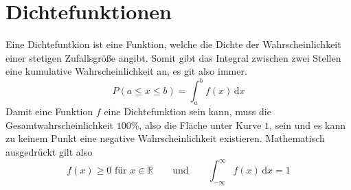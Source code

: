 \documentclass{article}
\begin{document}
\section{Dichtefunktionen}
Eine Dichtefuntkion ist eine Funktion, welche die Dichte der Wahrscheinlichkeit einer stetigen Zufallsgröße angibt. Somit gibt das Integral zwischen zwei Stellen eine kumulative Wahrscheinlichkeit an, es git also immer.
\[
 P(a \le x \le b) = \int_a^b f(x)\,\text{d}x 
\] 
Damit eine Funktion $f$ eine Dichtefunktion sein kann, muss die Gesamtwahrscheinlichkeit $100\%$, also die Fläche unter Kurve $1$, sein und es kann zu keinem Punkt eine negative Wahrscheinlichkeit existieren. Mathematisch ausgedrückt gilt also 
\[
 f(x) \ge 0 \text{ für } x \in \mathbb{R}
 \qquad \text{und} \qquad  
 \int_{-\infty}^\infty f(x)\,\text{d}x = 1 
\]  
\end{document}

